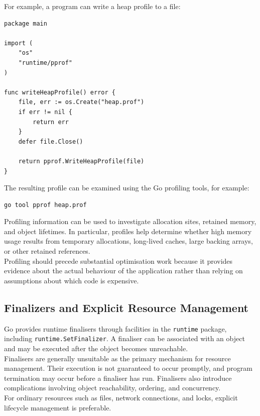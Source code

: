 For example, a program can write a heap profile to a file:

\begin{lstlisting}
package main

import (
    "os"
    "runtime/pprof"
)

func writeHeapProfile() error {
    file, err := os.Create("heap.prof")
    if err != nil {
        return err
    }
    defer file.Close()

    return pprof.WriteHeapProfile(file)
}
\end{lstlisting}

The resulting profile can be examined using the Go profiling tools, for example:

\begin{lstlisting}
go tool pprof heap.prof
\end{lstlisting}

Profiling information can be used to investigate allocation sites, retained memory, and object lifetimes. In particular, profiles help determine whether high memory usage results from temporary allocations, long-lived caches, large backing arrays, or other retained references.\\

Profiling should precede substantial optimisation work because it provides evidence about the actual behaviour of the application rather than relying on assumptions about which code is expensive.\\

\subsection{Finalizers and Explicit Resource Management}

Go provides runtime finalisers through facilities in the \texttt{runtime} package, including \texttt{runtime.SetFinalizer}. A finaliser can be associated with an object and may be executed after the object becomes unreachable.\\

Finalisers are generally unsuitable as the primary mechanism for resource management. Their execution is not guaranteed to occur promptly, and program termination may occur before a finaliser has run. Finalisers also introduce complications involving object reachability, ordering, and concurrency.\\

For ordinary resources such as files, network connections, and locks, explicit lifecycle management is preferable.

